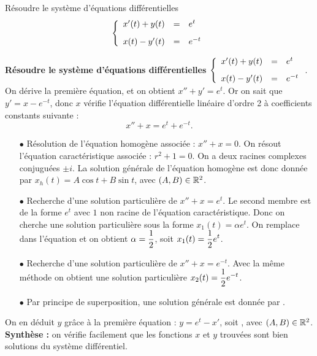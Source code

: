 \documentclass[a4paper, 11pt,reqno]{article}
\begin{document}
\begin{exercice}  \;
R\'esoudre le syst\`eme d'\'equations diff\'erentielles
$$\left\lbrace\begin{array}{lll} x^{\prime}(t)+y(t)&=& e^t\vsec\\x(t)-y^{\prime}(t)&=&e^{-t}      \end{array}\right.$$
\end{exercice}
\begin{correction}  \;
\textbf{R\'esoudre le syst\`eme d'\'equations diff\'erentielles 
$\mathbf{\left\lbrace\begin{array}{lll} 
x^{\prime}(t)+y(t) &=& e^t\vsec\\
x(t)-y^{\prime}(t) &=& e^{-t}
\end{array}\right.}$}.\\
On d\'erive la premi\`ere \'equation, et on obtient $x''+y'=e^t$. Or on sait que $y'=x-e^{-t}$, donc $x$ v\'erifie l'\'equation diff\'erentielle lin\'eaire d'ordre 2 \`a coefficients constants suivante :
$$x''+x=e^t + e^{-t}.$$
\begin{itemize}
\item[$\bullet$] R\'esolution de l'\'equation homog\`ene associ\'ee : $x''+x=0$. On r\'esout l'\'equation caract\'eristique associ\'ee : $r^2+1=0$. On a deux racines complexes conjugu\'ees $\pm i$. La solution g\'en\'erale de l'\'equation homog\`ene est donc donn\'ee par $x_h(t) = A\cos t + B \sin t$, avec $(A,B) \in \mathbb{R}^2$.
\item[$\bullet$] Recherche d'une solution particuli\`ere de $x''+x=e^t$. Le second membre est de la forme $e^t$ avec $1$ non racine de l'\'equation caract\'eristique. Donc on cherche une solution particuli\`ere sous la forme $x_1(t) = \alpha e^t$. On remplace dans l'\'equation et on obtient $\alpha = \displaystyle \frac{1}{2}$, soit $x_1(t) = \displaystyle \frac{1}{2} e^t$.
\item[$\bullet$] Recherche d'une solution particuli\`ere de $x''+x=e^{-t}$. Avec la m\^eme m\'ethode on obtient une solution particuli\`ere $x_2(t) = \displaystyle \frac{1}{2} e^{-t}$.
\item[$\bullet$] Par principe de superposition, une solution g\'en\'erale est donn\'ee par .
\end{itemize}
On en d\'eduit $y$ gr\^ace \`a la premi\`ere \'equation : $y = e^t - x'$, soit , avec $(A,B) \in \mathbb{R}^2$.\\
\textbf{Synth\`ese :} on v\'erifie facilement que les fonctions $x$ et $y$ trouv\'ees sont bien solutions du syst\`eme diff\'erentiel.
\end{correction}
\end{document}
